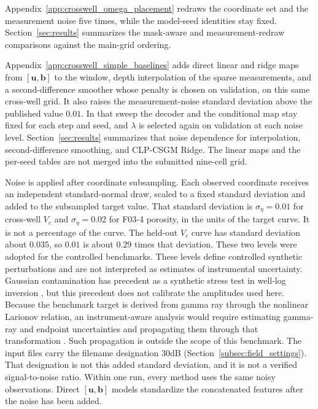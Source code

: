 Appendix~\ref{app:crosswell_omega_placement} redraws the coordinate set and
the measurement noise five times, while the model-seed identities stay fixed.
Section~\ref{sec:results} summarizes the mask-aware and measurement-redraw
comparisons against the main-grid ordering.

Appendix~\ref{app:crosswell_simple_baselines} adds direct linear and ridge
maps from $[\boldsymbol{u},\boldsymbol{b}]$ to the window, depth
interpolation of the sparse measurements, and a second-difference smoother
whose penalty is chosen on validation, on this same cross-well grid.
It also raises the measurement-noise standard deviation above the published
value $0.01$. In that sweep the decoder and the conditional map stay fixed
for each step and seed, and $\lambda$ is selected again on validation at
each noise level. Section~\ref{sec:results} summarizes that noise dependence
for interpolation, second-difference smoothing, and CLP-CSGM Ridge. The
linear maps and the per-seed tables are not merged into the submitted
nine-cell grid.

Noise is applied after coordinate subsampling. Each observed coordinate
receives an independent standard-normal draw, scaled to a fixed standard
deviation and added to the subsampled target value. That standard deviation
is $\sigma_{\eta}=0.01$ for cross-well $V_c$ and $\sigma_{\eta}=0.02$ for
F03-4 porosity, in the units of the target curve. It is not a percentage of
the curve. The held-out $V_c$ curve has standard deviation about $0.035$, so
$0.01$ is about $0.29$ times that deviation. These two levels were adopted
for the controlled benchmarks. These levels define controlled synthetic
perturbations and are not interpreted as estimates of instrumental
uncertainty. Gaussian contamination has precedent as a synthetic stress test
in well-log inversion \citep{abdelrahman2024hurst}, but this precedent does
not calibrate the amplitudes used here. Because the benchmark target is
derived from gamma ray through the nonlinear Larionov relation, an
instrument-aware analysis would require estimating gamma-ray and endpoint
uncertainties and propagating them through that transformation
\citep{adjei2019probabilistic}. Such propagation is outside the scope of this
benchmark. The input files carry the filename designation 30dB
(Section~\ref{subsec:field_settings}). That designation is not this added
standard deviation, and it is not a verified signal-to-noise ratio. Within
one run, every method uses the same noisy observations. Direct
$[\boldsymbol{u},\boldsymbol{b}]$ models standardize the concatenated
features after the noise has been added.


